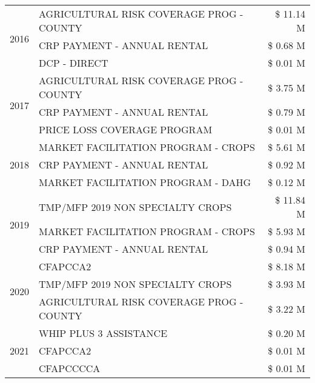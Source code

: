 \begin{tabular}{llr}
\cline{1-3}
\multirow[t]{3}{*}{2016} & AGRICULTURAL RISK COVERAGE PROG - COUNTY      & \$ 11.14 M \\
 & CRP PAYMENT - ANNUAL RENTAL                   & \$ 0.68 M \\
 & DCP - DIRECT                                  & \$ 0.01 M \\
\cline{1-3}
\multirow[t]{3}{*}{2017} & AGRICULTURAL RISK COVERAGE PROG - COUNTY & \$ 3.75 M \\
 & CRP PAYMENT - ANNUAL RENTAL & \$ 0.79 M \\
 & PRICE LOSS COVERAGE PROGRAM & \$ 0.01 M \\
\cline{1-3}
\multirow[t]{3}{*}{2018} & MARKET FACILITATION PROGRAM - CROPS & \$ 5.61 M \\
 & CRP PAYMENT - ANNUAL RENTAL & \$ 0.92 M \\
 & MARKET FACILITATION PROGRAM - DAHG & \$ 0.12 M \\
\cline{1-3}
\multirow[t]{3}{*}{2019} & TMP/MFP 2019 NON SPECIALTY CROPS & \$ 11.84 M \\
 & MARKET FACILITATION PROGRAM - CROPS & \$ 5.93 M \\
 & CRP PAYMENT - ANNUAL RENTAL & \$ 0.94 M \\
\cline{1-3}
\multirow[t]{3}{*}{2020} & CFAPCCA2 & \$ 8.18 M \\
 & TMP/MFP 2019 NON SPECIALTY CROPS & \$ 3.93 M \\
 & AGRICULTURAL RISK COVERAGE PROG - COUNTY & \$ 3.22 M \\
\cline{1-3}
\multirow[t]{3}{*}{2021} & WHIP PLUS 3 ASSISTANCE & \$ 0.20 M \\
 & CFAPCCA2 & \$ 0.01 M \\
 & CFAPCCCCA & \$ 0.01 M \\
\cline{1-3}
\bottomrule
\end{tabular}
